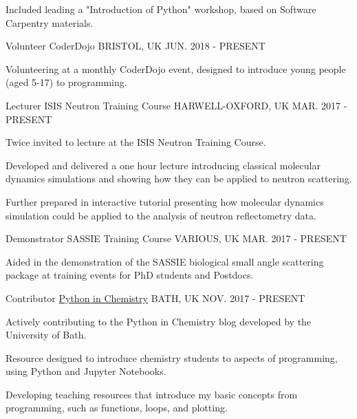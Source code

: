 \begin{cventries}
{\begin{cvitems}
			\item {Included leading a "Introduction of Python" workshop, based on Software Carpentry materials. }
		\end{cvitems}
	}
	\cventry
	{Volunteer}
	{CoderDojo}
	{BRISTOL, UK}
	{JUN. 2018 - PRESENT}
	{
	    \begin{cvitems}
	        \item {Volunteering at a monthly CoderDojo event, designed to introduce young people (aged 5-17) to programming.}
	    \end{cvitems}
	}
	\cventry
	{Lecturer}
	{ISIS Neutron Training Course}
	{HARWELL-OXFORD, UK}
	{MAR. 2017 - PRESENT}
	{
		\begin{cvitems}
			\item {Twice invited to lecture at the ISIS Neutron Training Course.}
			\item {Developed and delivered a one hour lecture introducing classical molecular dynamics simulations and showing how they can be applied to neutron scattering.}
			\item {Further prepared in interactive tutorial presenting how molecular dynamics simulation could be applied to the analysis of neutron reflectometry data.}
		\end{cvitems}
	}
	\cventry
	{Demonstrator}
	{SASSIE Training Course}
	{VARIOUS, UK}
	{MAR. 2017 - PRESENT}
	{
		\begin{cvitems}
			\item {Aided in the demonstration of the SASSIE biological small angle scattering package at training events for PhD students and Postdocs.}
		\end{cvitems}
	}
	\cventry
	{Contributor}
	{\href{http://blogs.bath.ac.uk/python/}{Python in Chemistry}}
	{BATH, UK}
	{NOV. 2017 - PRESENT}
	{
		\begin{cvitems}
			\item {Actively contributing to the Python in Chemistry blog developed by the University of Bath.}
			\item {Resource designed to introduce chemistry students to aspects of programming, using Python and Jupyter Notebooks.}
			\item {Developing teaching resources that introduce my basic concepts from programming, such as functions, loops, and plotting.}
		\end{cvitems}
	}
\end{cventries}




